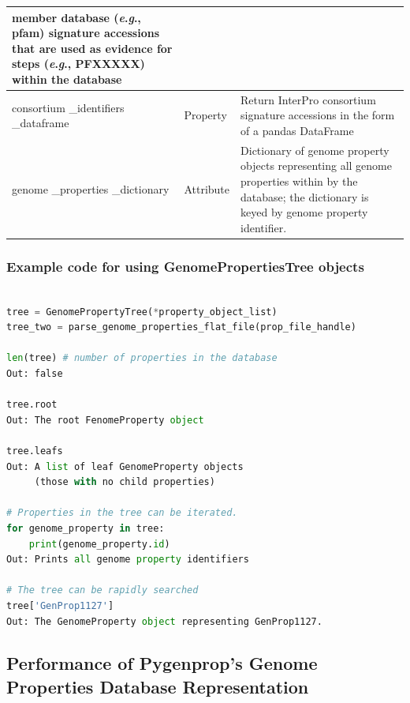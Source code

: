 \begin{longtable}{|p{2.7cm}|p{2cm}|p{10cm}|}
member database (\textit{e}.\textit{g}., \gls{pfam}) signature accessions that are used as 
evidence for steps (\textit{e}.\textit{g}., PFXXXXX) within the database                           
 \\ \hline
consortium \_identifiers \_dataframe   & Property  & Return InterPro consortium signature accessions in the form of a pandas DataFrame  \cite{mckinney2010data}                              
                          \\ \hline
genome \_properties \_dictionary    & Attribute  & Dictionary of genome property 
objects representing all genome properties within by the database; the 
dictionary is keyed by genome property identifier.                              
\\ \hline
\end{longtable}

\FloatBarrier
\subsubsection{Example code for using GenomePropertiesTree objects}

\begin{lstlisting}[language=Python]

tree = GenomePropertyTree(*property_object_list)
tree_two = parse_genome_properties_flat_file(prop_file_handle)
	
len(tree) # number of properties in the database
Out: false

tree.root
Out: The root FenomeProperty object

tree.leafs
Out: A list of leaf GenomeProperty objects 
     (those with no child properties)

# Properties in the tree can be iterated.
for genome_property in tree: 
	print(genome_property.id)
Out: Prints all genome property identifiers

# The tree can be rapidly searched
tree['GenProp1127'] 
Out: The GenomeProperty object representing GenProp1127.

\end{lstlisting}

\subsection{Performance of Pygenprop's Genome Properties Database 
Representation}

